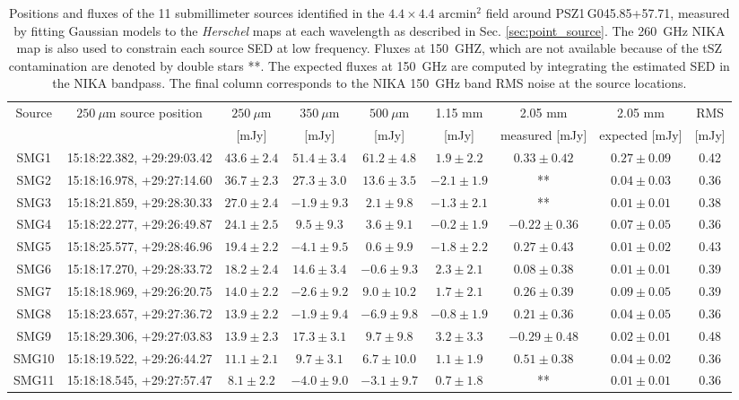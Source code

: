 \documentclass[traditabstract]{aa}
\begin{document}
\begin{table}[h]
\begin{center}
\begin{tabular}{ccccccccc}
\hline
\hline
Source & $250~\mu$m source position & $250~\mu$m & $350~\mu$m & $500~\mu$m & 1.15 mm & 2.05 mm & 2.05 mm & RMS\\
 &  & [mJy] & [mJy] & [mJy] & [mJy] & measured [mJy] & expected [mJy] & [mJy]\\
\hline
SMG1 & 15:18:22.382, +29:29:03.42 & $43.6\pm 2.4$ & $51.4\pm 3.4$ & $61.2\pm 4.8$ & $1.9\pm 2.2$ & $0.33\pm  0.42$& $0.27\pm  0.09$ & 0.42\\
SMG2 & 15:18:16.978, +29:27:14.60 & $36.7\pm 2.3$ & $27.3\pm 3.0$ & $13.6\pm 3.5$ & $-2.1\pm 1.9$ & **& $0.04\pm  0.03$ & 0.36\\
SMG3 & 15:18:21.859, +29:28:30.33 & $27.0\pm 2.4$ & $-1.9\pm 9.3$ & $2.1\pm 9.8$ & $-1.3\pm 2.1$ & **& $0.01\pm  0.01$ & 0.38\\
SMG4 & 15:18:22.277, +29:26:49.87 & $24.1\pm 2.5$ & $9.5\pm 9.3$ & $3.6\pm 9.1$ & $-0.2\pm 1.9$ & $-0.22\pm  0.36$& $0.07\pm  0.05$ & 0.36\\
SMG5 & 15:18:25.577, +29:28:46.96 & $19.4\pm 2.2$ & $-4.1\pm 9.5$ & $0.6\pm 9.9$ & $-1.8\pm 2.2$ & $0.27\pm  0.43$& $0.01\pm  0.02$ & 0.43\\
SMG6 & 15:18:17.270, +29:28:33.72 & $18.2\pm 2.4$ & $14.6\pm 3.4$ & $-0.6\pm 9.3$ & $2.3\pm 2.1$ & $0.08\pm  0.38$& $0.01\pm  0.01$ & 0.39\\
SMG7 & 15:18:18.969, +29:26:20.75 & $14.0\pm 2.2$ & $-2.6\pm 9.2$ & $9.0\pm 10.2$ & $1.7\pm 2.1$ & $0.26\pm  0.39$& $0.09\pm  0.05$ & 0.39\\
SMG8 & 15:18:23.657, +29:27:36.72 & $13.9\pm 2.2$ & $-1.9\pm 9.4$ & $-6.9\pm 9.8$ & $-0.8\pm 1.9$ & $0.21\pm  0.36$& $0.04\pm  0.05$ & 0.36\\
SMG9 & 15:18:29.306, +29:27:03.83 & $13.9\pm 2.3$ & $17.3\pm 3.1$ & $9.7\pm 9.8$ & $3.2\pm 3.3$ & $-0.29\pm  0.48$& $0.02\pm  0.01$ & 0.48\\
SMG10 & 15:18:19.522, +29:26:44.27 & $11.1\pm 2.1$ & $9.7\pm 3.1$ & $6.7\pm 10.0$ & $1.1\pm 1.9$ &  $0.51\pm  0.38$&  $0.04\pm  0.02$ & 0.36\\
SMG11 & 15:18:18.545, +29:27:57.47 & $8.1\pm 2.2$ & $-4.0\pm 9.0$& $-3.1\pm 9.7$ & $0.7\pm 1.8$ & **& $0.01\pm  0.01$ & 0.36\\
\hline
\hline
\end{tabular}
\end{center}
\caption{{\footnotesize Positions and fluxes of the 11 submillimeter sources identified in the $4.4 \times 4.4$ $\mathrm{arcmin^2}$ field around \mbox{PSZ1\,G045.85+57.71}, measured by fitting Gaussian models to the {\it Herschel} maps at each wavelength as described in Sec. \ref{sec:point_source}. The 260~GHz NIKA map is also used to constrain each source SED at low frequency. Fluxes at 150~GHZ, which are not available because of the tSZ contamination are denoted by double stars **. The expected fluxes at 150~GHz are computed by integrating the estimated SED in the NIKA bandpass. The final column corresponds to the NIKA 150~GHz band RMS noise at the source locations.}}
\label{tab:Submm_ps_flux}
\end{table}
\end{document}
